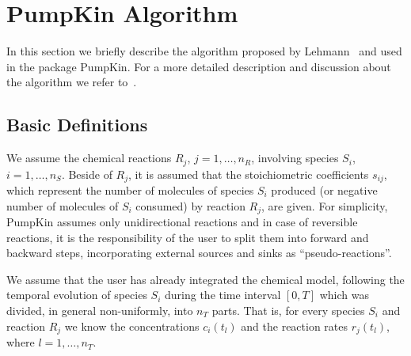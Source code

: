 
\chapter{PumpKin Algorithm}
\label{sec_6}

In this section we briefly describe the algorithm proposed by Lehmann~\cite{Lehman2003} and used in the package PumpKin. For a more detailed description and discussion about the algorithm we refer to~\cite{Lehman2003}.


\section{Basic Definitions}
\label{sec_6_1}
We assume the chemical reactions $R_j$, $j = 1, \ldots, n_R$, involving species $S_i$, $i = 1,\ldots, n_S$. Beside of $R_j$, it is assumed that the stoichiometric coefficients $s_{ij}$, which represent the number of molecules of species $S_i$ produced (or negative number of molecules of $S_i$ consumed) by reaction $R_j$, are given. For simplicity, PumpKin assumes only unidirectional reactions and in case of reversible reactions, it is the responsibility of the user to split them into forward and backward steps, incorporating external sources and sinks as ``pseudo-reactions''.

We assume that the user has already integrated the chemical model, following the temporal evolution of species $S_i$ during the time interval $\left[0, T\right]$ which was divided, in general non-uniformly, into $n_T$ parts. That is, for every species $S_i$ and reaction $R_j$ we know the concentrations $c_i(t_l)$ and the reaction rates $r_j(t_l)$, where $l = 1,\ldots,n_T$.

